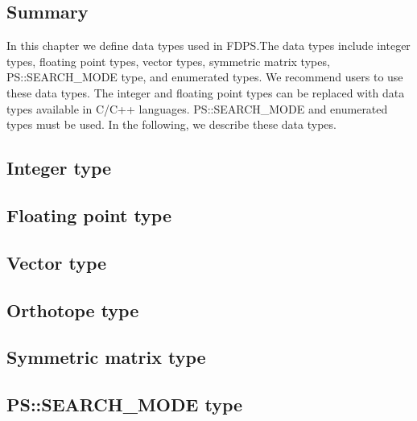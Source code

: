 \subsection{Summary}
In this chapter we define data types used in FDPS.The data types include
integer types, floating point types, vector types, symmetric matrix types,
PS::SEARCH\_MODE type, and enumerated types. We recommend users to
use these data types. The integer and floating point types can be
replaced with data types available in C/C++
languages. PS::SEARCH\_MODE and enumerated types must be used. In the
following, we describe these data types.


\subsection{Integer type}



\subsection{Floating point type}



\subsection{Vector type}
\label{sec:datatype_vector}


\subsection{Orthotope type}
\label{sec:datatype_orthotope}



\subsection{Symmetric matrix type}



\subsection{PS::SEARCH\_MODE type}

